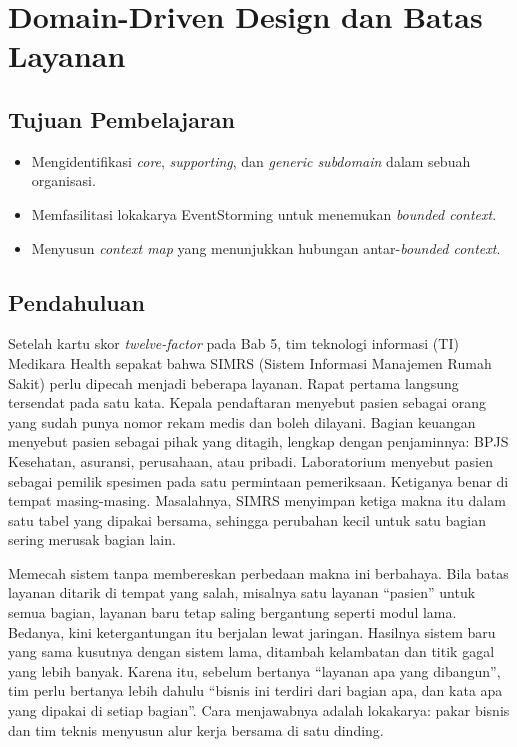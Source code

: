 \chapter{Domain-Driven Design dan Batas Layanan}
\label{ch:ch06}

\section*{Tujuan Pembelajaran}
\begin{itemize}
  \item Mengidentifikasi \textit{core}, \textit{supporting}, dan \textit{generic subdomain} dalam sebuah organisasi.
  \item Memfasilitasi lokakarya EventStorming untuk menemukan \textit{bounded context}.
  \item Menyusun \textit{context map} yang menunjukkan hubungan antar-\textit{bounded context}.
\end{itemize}

\section{Pendahuluan}

Setelah kartu skor \textit{twelve-factor} pada Bab 5, tim teknologi informasi (TI) Medikara Health
sepakat bahwa SIMRS (Sistem Informasi Manajemen Rumah Sakit) perlu dipecah menjadi beberapa
layanan. Rapat pertama langsung tersendat pada satu kata. Kepala pendaftaran menyebut pasien
sebagai orang yang sudah punya nomor rekam medis dan boleh dilayani. Bagian keuangan menyebut
pasien sebagai pihak yang ditagih, lengkap dengan penjaminnya: BPJS Kesehatan, asuransi,
perusahaan, atau pribadi. Laboratorium menyebut pasien sebagai pemilik spesimen pada satu
permintaan pemeriksaan. Ketiganya benar di tempat masing-masing. Masalahnya, SIMRS menyimpan
ketiga makna itu dalam satu tabel yang dipakai bersama, sehingga perubahan kecil untuk satu bagian
sering merusak bagian lain.

Memecah sistem tanpa membereskan perbedaan makna ini berbahaya. Bila batas layanan ditarik di
tempat yang salah, misalnya satu layanan ``pasien'' untuk semua bagian, layanan baru tetap saling
bergantung seperti modul lama. Bedanya, kini ketergantungan itu berjalan lewat jaringan. Hasilnya
sistem baru yang sama kusutnya dengan sistem lama, ditambah kelambatan dan titik gagal yang lebih
banyak. Karena itu, sebelum bertanya ``layanan apa yang dibangun'', tim perlu bertanya lebih dahulu
``bisnis ini terdiri dari bagian apa, dan kata apa yang dipakai di setiap bagian''. Cara
menjawabnya adalah lokakarya: pakar bisnis dan tim teknis menyusun alur kerja bersama di satu
dinding.

